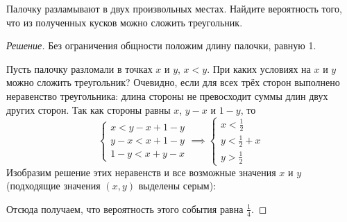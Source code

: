 \begin{problem}
    Палочку разламывают в двух произвольных местах. Найдите вероятность того, что из полученных кусков можно сложить треугольник.
\end{problem}
\begin{proof}[Решение]
    Без ограничения общности положим длину палочки, равную 1. 
    
    Пусть палочку разломали в точках \(x\) и \(y\), \(x < y\). При каких условиях на \(x\) и \(y\) можно сложить треугольник? Очевидно, если для всех трёх сторон выполнено неравенство треугольника: длина стороны не превосходит суммы длин двух других сторон. Так как стороны равны \(x\), \(y - x\) и \(1 - y\), то
    \[\begin{cases}
    x < y - x + 1 - y \\
    y - x < x + 1 - y \\
    1 - y < x + y - x
    \end{cases}
    \implies
    \begin{cases}
    x < \frac{1}{2} \\
    y < \frac{1}{2} + x \\
    y > \frac{1}{2}
    \end{cases}
    \]
    Изобразим решение этих неравенств и все возможные значения \(x\) и \(y\) (подходящие значения \((x, y)\) выделены серым):
    \begin{center}
    \end{center}

    Отсюда получаем, что вероятность этого события равна \(\frac{1}{4}\).
\end{proof}

